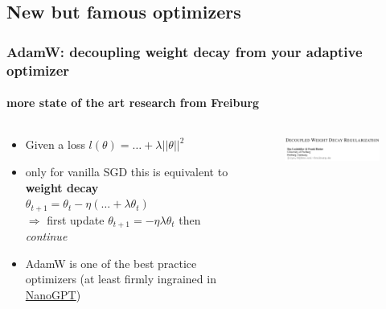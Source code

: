 \documentclass[
	11pt, %
	aspectratio=169, %
]{beamer}
\begin{document}

\subsection{New but famous optimizers}

\begin{frame}
	\frametitle{AdamW: decoupling weight decay from your adaptive optimizer}
	\framesubtitle{more state of the art research from Freiburg}
	 \begin{columns}[c] %
		\begin{column}{0.55\textwidth} %
			\begin{itemize}
				\item Given a loss $l(\theta) = \hdots + \lambda \vert \vert \theta \vert \vert^2 $
				\item only for vanilla SGD this is equivalent to \textbf{weight decay} \\
				 $\theta_{t+1} = \theta_t - \eta( \dots + \lambda \theta_t) $\\
				 \vspace{1em}
				 $\Longrightarrow$ first update $\theta_{t+1} = -\eta \lambda \theta_t$ then \textit{continue}
				 \item AdamW is one of the best practice optimizers (at least firmly ingrained in \href{https://github.com/karpathy/nanoGPT}{NanoGPT})

			\end{itemize}
		\end{column}
		\begin{column}{0.35\textwidth} %
        	\begin{figure}
        	    \centering
                \includegraphics[width=8cm]{figures/adamw.png}
        	    \caption*{}
        	\end{figure}
		\end{column}
	\end{columns}
\end{frame}
\end{document}
